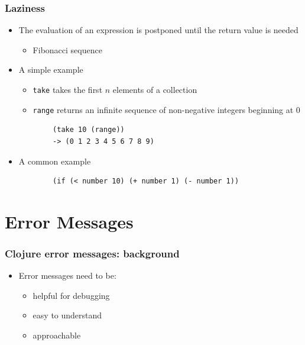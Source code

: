 \documentclass{beamer}
\begin{document}
\begin{frame}[fragile]
\frametitle{Laziness}
	\begin{itemize}
  	  \item The evaluation of an expression is postponed until the return value is needed
  	  \begin{itemize}
  	    \item Fibonacci sequence
  	  \end{itemize}
  	  \item A simple example
  	  \begin{itemize}
  	    \item \texttt{take} takes the first $n$ elements of a collection
  	    \item \texttt{range} returns an infinite sequence of non-negative integers beginning at 0
  	  \end{itemize}
  	  \begin{verbatim}
  	 	(take 10 (range))
  	 	-> (0 1 2 3 4 5 6 7 8 9)
  	  \end{verbatim}
  	  \item A common example
  	  \begin{verbatim}
  	 	(if (< number 10) (+ number 1) (- number 1))
  	  \end{verbatim}
   \end{itemize}
\end{frame}

\section{Error Messages}

\begin{frame}
\frametitle{Clojure error messages: background}
	\begin{itemize}
  		\item Error messages need to be:
  		\begin{itemize}
  	 		\item helpful for debugging
  	 		\item easy to understand
  	 		\item approachable
  		\end{itemize}
	 \end{itemize}
\end{frame}
\end{document}
